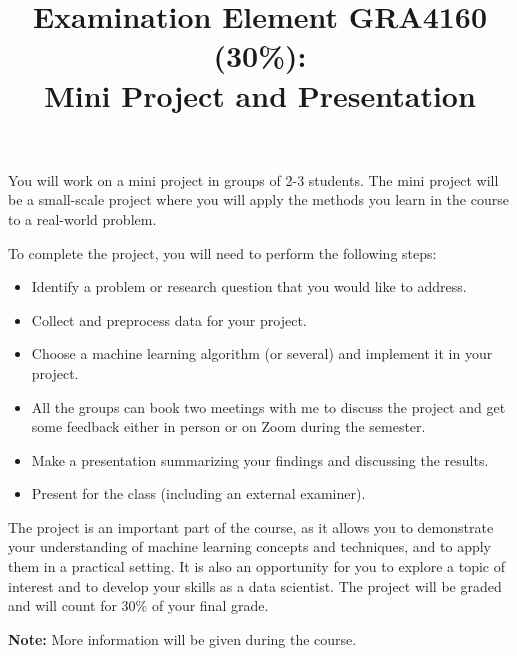 \documentclass[a4paper,12pt]{article}
\title{Examination Element GRA4160 (30\%): \\ Mini Project and Presentation}
\date{}
\begin{document}
\maketitle

\noindent
You will work on a mini project in groups of 2-3 students.
The mini project will be a small-scale project where you will apply the methods you learn in the course to a real-world problem.

\bigskip
\noindent
To complete the project, you will need to perform the following steps:
\begin{itemize}
  \item Identify a problem or research question that you would like to address.
  \item Collect and preprocess data for your project.
  \item Choose a machine learning algorithm (or several) and implement it in your project.
  \item All the groups can book two meetings with me to discuss the project and get some feedback either in person or on Zoom during the semester.
  \item Make a presentation summarizing your findings and discussing the results.
  \item Present for the class (including an external examiner).
\end{itemize}

\noindent
The project is an important part of the course, as it allows you to demonstrate your understanding of machine learning concepts and techniques,
and to apply them in a practical setting.
It is also an opportunity for you to explore a topic of interest and to develop your skills as a data scientist.
The project will be graded and will count for 30\% of your final grade.

\vspace{1em}
\noindent\textbf{Note:} More information will be given during the course.
\end{document}
